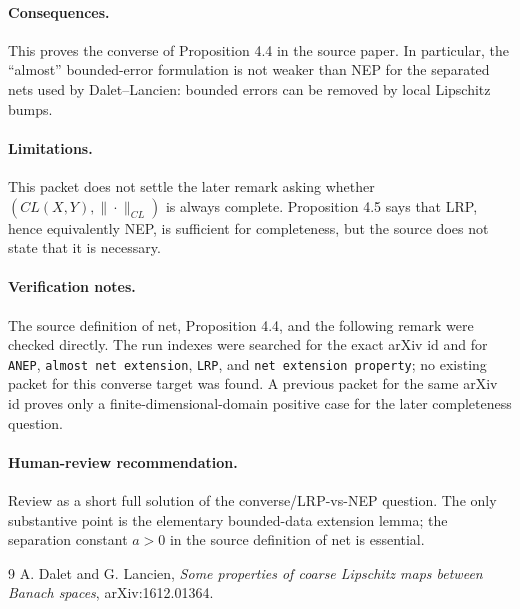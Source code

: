 \documentclass[11pt]{article}
\begin{document}
\paragraph{Consequences.}
This proves the converse of Proposition 4.4 in the source paper.  In
particular, the ``almost'' bounded-error formulation is not weaker than NEP
for the separated nets used by Dalet--Lancien: bounded errors can be removed
by local Lipschitz bumps.

\paragraph{Limitations.}
This packet does not settle the later remark asking whether
\((CL(X,Y),\|\cdot\|_{CL})\) is always complete.  Proposition 4.5 says that
LRP, hence equivalently NEP, is sufficient for completeness, but the source
does not state that it is necessary.

\paragraph{Verification notes.}
The source definition of net, Proposition 4.4, and the following remark were
checked directly.  The run indexes were searched for the exact arXiv id and
for \texttt{ANEP}, \texttt{almost net extension}, \texttt{LRP}, and
\texttt{net extension property}; no existing packet for this converse target
was found.  A previous packet for the same arXiv id proves only a
finite-dimensional-domain positive case for the later completeness question.

\paragraph{Human-review recommendation.}
Review as a short full solution of the converse/LRP-vs-NEP question.  The
only substantive point is the elementary bounded-data extension lemma; the
separation constant \(a>0\) in the source definition of net is essential.

\begin{thebibliography}{9}
A. Dalet and G. Lancien,
\emph{Some properties of coarse Lipschitz maps between Banach spaces},
arXiv:1612.01364.
\end{thebibliography}
\end{document}
